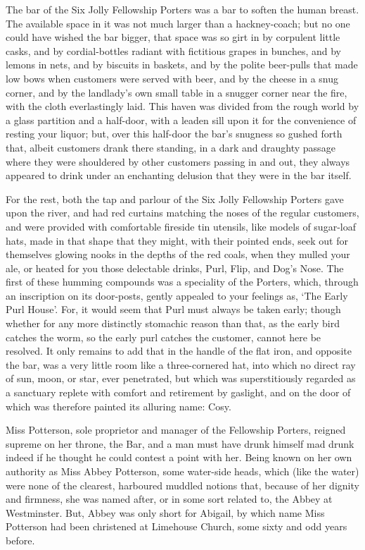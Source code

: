 The bar of the Six Jolly Fellowship Porters was a bar to soften the
human breast. The available space in it was not much larger than a
hackney-coach; but no one could have wished the bar bigger, that space
was so girt in by corpulent little casks, and by cordial-bottles
radiant with fictitious grapes in bunches, and by lemons in nets, and
by biscuits in baskets, and by the polite beer-pulls that made low
bows when customers were served with beer, and by the cheese in a snug
corner, and by the landlady’s own small table in a snugger corner near
the fire, with the cloth everlastingly laid. This haven was divided from
the rough world by a glass partition and a half-door, with a leaden
sill upon it for the convenience of resting your liquor; but, over this
half-door the bar’s snugness so gushed forth that, albeit customers
drank there standing, in a dark and draughty passage where they were
shouldered by other customers passing in and out, they always appeared
to drink under an enchanting delusion that they were in the bar itself.

For the rest, both the tap and parlour of the Six Jolly Fellowship
Porters gave upon the river, and had red curtains matching the noses of
the regular customers, and were provided with comfortable fireside tin
utensils, like models of sugar-loaf hats, made in that shape that they
might, with their pointed ends, seek out for themselves glowing nooks
in the depths of the red coals, when they mulled your ale, or heated for
you those delectable drinks, Purl, Flip, and Dog’s Nose. The first of
these humming compounds was a speciality of the Porters, which, through
an inscription on its door-posts, gently appealed to your feelings as,
‘The Early Purl House’. For, it would seem that Purl must always be
taken early; though whether for any more distinctly stomachic reason
than that, as the early bird catches the worm, so the early purl catches
the customer, cannot here be resolved. It only remains to add that in
the handle of the flat iron, and opposite the bar, was a very little
room like a three-cornered hat, into which no direct ray of sun, moon,
or star, ever penetrated, but which was superstitiously regarded as a
sanctuary replete with comfort and retirement by gaslight, and on the
door of which was therefore painted its alluring name: Cosy.

Miss Potterson, sole proprietor and manager of the Fellowship Porters,
reigned supreme on her throne, the Bar, and a man must have drunk
himself mad drunk indeed if he thought he could contest a point with
her. Being known on her own authority as Miss Abbey Potterson, some
water-side heads, which (like the water) were none of the clearest,
harboured muddled notions that, because of her dignity and firmness, she
was named after, or in some sort related to, the Abbey at Westminster.
But, Abbey was only short for Abigail, by which name Miss Potterson had
been christened at Limehouse Church, some sixty and odd years before.

